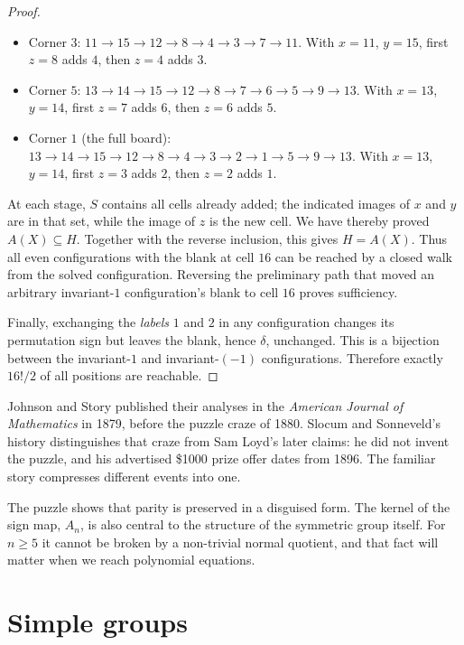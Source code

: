 \begin{proof}
\begin{itemize}
\item Corner $3$:
$11\to15\to12\to8\to4\to3\to7\to11$.
With $x=11$, $y=15$, first $z=8$
adds $4$, then $z=4$ adds $3$.

\item Corner $5$:
$13\to14\to15\to12\to8\to7\to6\to5\to9\to13$.
With $x=13$, $y=14$, first $z=7$
adds $6$, then $z=6$ adds $5$.

\item Corner $1$ (the full board):
$13\to14\to15\to12\to8\to4\to3\to2
\to1\to5\to9\to13$.
With $x=13$, $y=14$, first $z=3$
adds $2$, then $z=2$ adds $1$.
\end{itemize}

At each stage, $S$ contains all cells already
added; the indicated images of $x$ and $y$
are in that set, while the image of $z$
is the new cell. We have thereby proved
$A(X)\subseteq H$. Together with the
reverse inclusion, this gives $H=A(X)$.
Thus all even configurations with the
blank at cell $16$ can be reached by a
closed walk from the solved configuration.
Reversing the preliminary path that moved
an arbitrary invariant-$1$ configuration's
blank to cell $16$ proves sufficiency.

Finally, exchanging the \emph{labels} $1$
and $2$ in any configuration changes its
permutation sign but leaves the blank,
hence $\delta$, unchanged. This is a
bijection between the invariant-$1$ and
invariant-$(-1)$ configurations.
Therefore exactly $16!/2$ of all
positions are reachable.
\end{proof}

\begin{remark}
Johnson and Story published their analyses in the \emph{American Journal of Mathematics} in 1879, before the puzzle craze of 1880. Slocum and Sonneveld's history distinguishes that craze from Sam Loyd's later claims: he did not invent the puzzle, and his advertised \$1000 prize offer dates from 1896. The familiar story compresses different events into one.
\end{remark}

The puzzle shows that parity is preserved in a disguised form. The kernel of the sign map, $A_n$, is also central to the structure of the symmetric group itself. For $n\ge5$ it cannot be broken by a non-trivial normal quotient, and that fact will matter when we reach polynomial equations.

\section{Simple groups}

